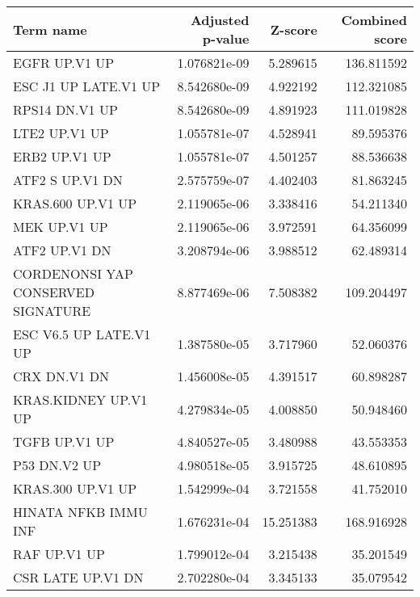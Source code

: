 \begin{tabular}{lrrr}
\toprule
                         Term name &  Adjusted p-value &   Z-score &  Combined score \\
\midrule
                     EGFR UP.V1 UP &      1.076821e-09 &  5.289615 &      136.811592 \\
              ESC J1 UP LATE.V1 UP &      8.542680e-09 &  4.922192 &      112.321085 \\
                    RPS14 DN.V1 UP &      8.542680e-09 &  4.891923 &      111.019828 \\
                     LTE2 UP.V1 UP &      1.055781e-07 &  4.528941 &       89.595376 \\
                     ERB2 UP.V1 UP &      1.055781e-07 &  4.501257 &       88.536638 \\
                   ATF2 S UP.V1 DN &      2.575759e-07 &  4.402403 &       81.863245 \\
                 KRAS.600 UP.V1 UP &      2.119065e-06 &  3.338416 &       54.211340 \\
                      MEK UP.V1 UP &      2.119065e-06 &  3.972591 &       64.356099 \\
                     ATF2 UP.V1 DN &      3.208794e-06 &  3.988512 &       62.489314 \\
CORDENONSI YAP CONSERVED SIGNATURE &      8.877469e-06 &  7.508382 &      109.204497 \\
            ESC V6.5 UP LATE.V1 UP &      1.387580e-05 &  3.717960 &       52.060376 \\
                      CRX DN.V1 DN &      1.456008e-05 &  4.391517 &       60.898287 \\
              KRAS.KIDNEY UP.V1 UP &      4.279834e-05 &  4.008850 &       50.948460 \\
                     TGFB UP.V1 UP &      4.840527e-05 &  3.480988 &       43.553353 \\
                      P53 DN.V2 UP &      4.980518e-05 &  3.915725 &       48.610895 \\
                 KRAS.300 UP.V1 UP &      1.542999e-04 &  3.721558 &       41.752010 \\
              HINATA NFKB IMMU INF &      1.676231e-04 & 15.251383 &      168.916928 \\
                      RAF UP.V1 UP &      1.799012e-04 &  3.215438 &       35.201549 \\
                 CSR LATE UP.V1 DN &      2.702280e-04 &  3.345133 &       35.079542 \\

\end{tabular}
